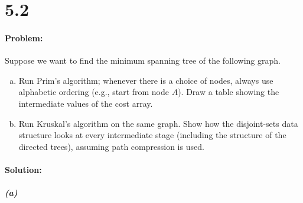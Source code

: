 \documentclass[12pt]{article}
\begin{document}
\section*{5.2}
\paragraph{Problem:}
Suppose we want to find the minimum spanning tree of the following graph.

\begin{center}
\end{center}

\begin{enumerate}[(a)]
\item Run Prim’s algorithm; whenever there is a choice of nodes, always
      use alphabetic ordering (e.g., start from node $A$). Draw a table showing
      the intermediate values of the cost array.

\item Run Kruskal’s algorithm on the same graph. Show how the
      disjoint-sets data structure looks at every intermediate stage
      (including the structure of the directed trees), assuming path
      compression is used.
\end{enumerate}

\paragraph{Solution:}
\subparagraph{(a)}
\end{document}

